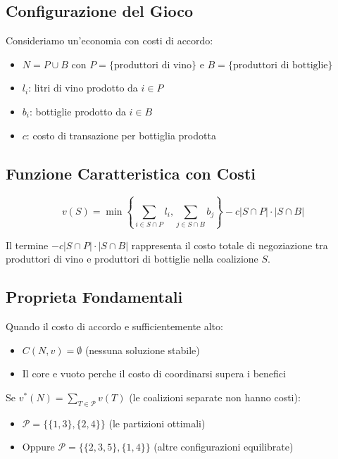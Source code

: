 \documentclass[12pt,a4paper]{article}
\theoremstyle{definition}
\begin{document}
\subsection*{Configurazione del Gioco}

Consideriamo un'economia con costi di accordo:
\begin{itemize}
    \item $N = P \cup B$ con $P = \{\text{produttori di vino}\}$ e $B = \{\text{produttori di bottiglie}\}$
    \item $l_i$: litri di vino prodotto da $i \in P$
    \item $b_i$: bottiglie prodotto da $i \in B$
    \item $c$: costo di transazione per bottiglia prodotta
\end{itemize}

\subsection*{Funzione Caratteristica con Costi}

\[
v(S) = \min \left\{ \sum_{i \in S \cap P} l_i, \sum_{j \in S \cap B} b_j \right\} - c |S \cap P| \cdot |S \cap B|
\]

Il termine $-c |S \cap P| \cdot |S \cap B|$ rappresenta il costo totale di negoziazione tra produttori di vino e produttori di bottiglie nella coalizione $S$.

\subsection*{Proprieta Fondamentali}

Quando il costo di accordo e sufficientemente alto:
\begin{itemize}
    \item $C(N, v) = \emptyset$ (nessuna soluzione stabile)
    \item Il core e vuoto perche il costo di coordinarsi supera i benefici
\end{itemize}

Se $v^*(N) = \sum_{T \in \mathcal{P}} v(T)$ (le coalizioni separate non hanno costi):
\begin{itemize}
    \item $\mathcal{P} = \{\{1, 3\}, \{2, 4\}\}$ (le partizioni ottimali)
    \item Oppure $\mathcal{P} = \{\{2, 3, 5\}, \{1, 4\}\}$ (altre configurazioni equilibrate)
\end{itemize}
\end{document}
